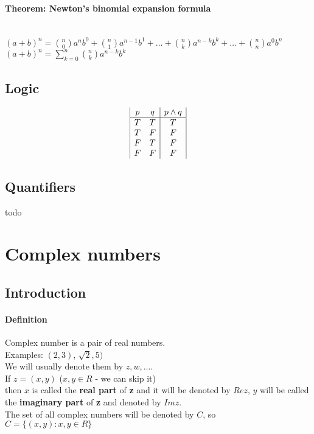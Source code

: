\documentclass{article}
\begin{document}
\paragraph{Theorem: Newton's binomial expansion formula}\mbox{}\\
$(a+b)^n={n \choose 0}a^{n}b^{0}+{n \choose 1}a^{n-1}b^{1}+\dots+{n \choose k}a^{n-k}b^{k}+\dots+{n \choose n}a^{0}b^{n}$\\
$(a+b)^n=\sum^n_{k=0} {n \choose k}a^{n-k}b^k$

\subsection{Logic}
\begin{displaymath}
    \begin{array}{|c c|c|}
        p & q & p \land q\\ %
        \hline %
        T & T & T\\
        T & F & F\\
        F & T & F\\
        F & F & F\\
    \end{array}
\end{displaymath}

\subsection{Quantifiers}
todo

\section{Complex numbers}
\subsection{Introduction}
\paragraph{Definition}
Complex number is a pair of real numbers.\\
Examples: $(2,3)$, $\sqrt{2},5)$\\
We will usually denote them by $z, w, \dots$.\\
If $z=(x,y)$ ($x, y \in R$ - we can skip it)\\
then $x$ is called the \textbf{real part} of \textbf{z} and it will be denoted by $Re z$, $y$ will be called the \textbf{imaginary part} of \textbf{z} and denoted by $Im z$.\\
The set of all complex numbers will be denoted by $C$, so\\
$C = \{(x, y): x, y \in R\}$
\end{document}
